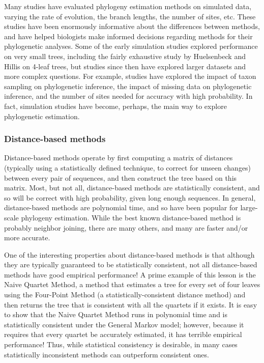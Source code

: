 Many studies have evaluated phylogeny estimation methods on simulated 
data, varying the rate of evolution, the branch lengths, the number 
of sites, etc. These studies have been enormously informative about 
the differences between methods, and have helped biologists make 
informed decisions regarding methods for their phylogenetic analyses. 
Some of the early simulation studies explored performance on very 
small trees, including the fairly exhaustive study by Huelsenbeck 
and Hillis on 4-leaf trees, but studies since then have explored 
larger datasets and more complex questions. For example, studies 
have explored the impact of taxon sampling on phylogenetic 
inference, the impact of missing data on phylogenetic inference, 
and the number of sites needed for accuracy with high probability. 
In fact, simulation studies have become, perhaps, the main way to 
explore phylogenetic estimation. 

\subsubsection{Distance-based methods} \label{methods}
Distance-based methods operate by first computing a matrix of 
distances (typically using a statistically defined technique, 
to correct for unseen changes) between every pair of sequences, 
and then construct the tree based on this matrix. Most, but not all, 
distance-based methods are statistically consistent, and so will 
be correct with high probability, given long enough sequences. 
In general, distance-based methods are polynomial time, and so 
have been popular for large-scale phylogeny estimation. 
While the best known distance-based method is probably neighbor 
joining, there are many others, and many are faster and/or 
more accurate. 

One of the interesting properties about distance-based 
methods is that although they are typically guaranteed 
to be statistically consistent, not all distance-based 
methods have good empirical performance! A prime example 
of this lesson is the Naive Quartet Method, a method that 
estimates a tree for every set of four leaves using the 
Four-Point Method (a statistically-consistent distance method) 
and then returns the tree that is consistent with all the 
quartets if it exists. It is easy to show that the Naive 
Quartet Method runs in polynomial time and is statistically 
consistent under the General Markov model; however, because 
it requires that every quartet be accurately estimated, 
it has terrible empirical performance! Thus, while 
statistical consistency is desirable, in many cases statistically 
inconsistent methods can outperform consistent ones.

